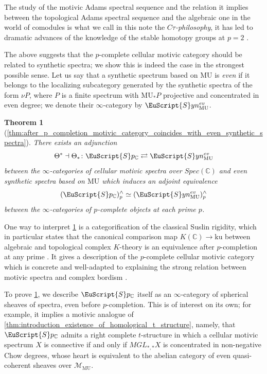 \documentclass[oneside,a4paper]{amsart}
\newcommand{\euscr}[1]{\EuScript{#1}} %
\newcommand{\MU}{\mathrm{MU}} %
\newcommand{\cspectra}{\euscr{S}p_{\mathbb{C}}} %
\newcommand{\synspectra}{\euscr{S}yn} %
\newcommand{\pcomplete}{^{\wedge} _{p}} %
\theoremstyle{plain}
\newtheorem{thm}{Theorem}[section]
\theoremstyle{definition}
\theoremstyle{remark}
\begin{document}
The study of the motivic Adams spectral sequence and the relation it implies between the topological Adams spectral sequence and the algebraic one in the world of comodules is what we call in this note the \emph{$C\tau$-philosophy}, it has led to dramatic advances of the knowledge of the stable homotopy groups at $p = 2$ \cite{more_stable_stems}.

The above suggests that the $p$-complete cellular motivic category should be related to synthetic spectra; we show this is indeed the case in the strongest possible sense. Let us say that a synthetic spectrum based on $\MU$ is \emph{even} if it belongs to the localizing subcategory generated by the synthetic spectra of the form $\nu P$, where $P$ is a finite spectrum with $\MU_{*}P$ projective and concentrated in even degree; we denote their $\infty$-category by $\synspectra_{\MU}^{ev}$.

\begin{thm}[\ref{thm:after_p_completion_motivic_category_coincides_with_even_synthetic_spectra}]
\label{thm:introduction_comparison_between_motivic_and_even_mu_synthetic_spectra}
There exists an adjunction 
\[
\Theta^{*} \dashv \Theta_{*} \colon \cspectra \rightleftarrows \synspectra_{\MU}^{ev}
\]
between the $\infty$-categories of cellular motivic spectra over $Spec(\mathbb{C})$ and even synthetic spectra based on $\MU$ which induces an adjoint equivalence
\[
(\cspectra) \pcomplete \simeq(\synspectra_{\MU}^{ev}) \pcomplete
\]
between the $\infty$-categories of $p$-complete objects at each prime $p$. 
\end{thm}

One way to interpret \cref{thm:introduction_comparison_between_motivic_and_even_mu_synthetic_spectra} is a categorification of the classical Suslin rigidity, which in particular states that the canonical comparison map $K(\mathbb{C}) \rightarrow \mathrm{ku}$ between algebraic and topological complex $K$-theory is an equivalence after $p$-completion at any prime \cite{suslin1983thek}. It  gives a description of the $p$-complete cellular motivic category which is concrete and well-adapted to explaining the strong relation between motivic spectra and complex bordism \cite{hoyois2015algebraic} \cite{levine2015adams}.

To prove \cref{thm:introduction_comparison_between_motivic_and_even_mu_synthetic_spectra}, we describe $\cspectra$ itself as an $\infty$-category of spherical sheaves of spectra, even before $p$-completion. This is of interest on its own; for example, it implies a motivic analogue of \cref{thm:introduction_existence_of_homological_t_structure}, namely, that $\cspectra$ admits a right complete $t$-structure in which a cellular motivic spectrum $X$ is connective if and only if $MGL_{*, *} X$ is concentrated in non-negative Chow degrees, whose heart is equivalent to the abelian category of even quasi-coherent sheaves over $\mathcal{M}_{\MU}$.  
\end{document}
